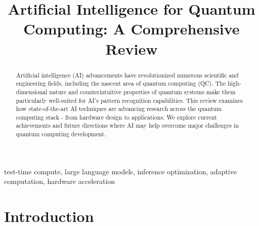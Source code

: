 \documentclass[conference]{IEEEtran}
\begin{document}
\title{Artificial Intelligence for Quantum Computing: A Comprehensive Review}

\author{
}

\maketitle

\begin{IEEEkeywords}
test-time compute, large language models, inference optimization, adaptive computation, hardware acceleration
\end{IEEEkeywords}


\begin{abstract}
Artificial intelligence (AI) advancements have revolutionized numerous scientific and engineering fields, including the nascent area of quantum computing (QC). The high-dimensional nature and counterintuitive properties of quantum systems make them particularly well-suited for AI's pattern recognition capabilities. This review examines how state-of-the-art AI techniques are advancing research across the quantum computing stack - from hardware design to applications. We explore current achievements and future directions where AI may help overcome major challenges in quantum computing development.
\end{abstract}


\section{Introduction}

\end{document}
